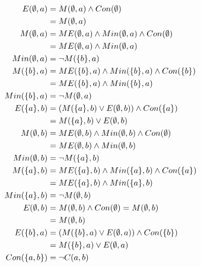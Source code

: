 \documentclass{article}
\begin{document}
\begin{example}
\begin{align*}
        E(\e, a)         & =  M(\e,a) \wedge Con(\e)                             \\
                         & = M(\e,a)                                             \\
        M(\e, a)         & =  ME(\e,a) \wedge Min(\e, a) \wedge Con(\e)          \\
                         & = ME(\e,a) \wedge Min(\e,a)                           \\
        Min(\e, a)       & = \neg M(\s{b},a)                                     \\
        M(\s{b}, a)      & =  ME(\s{b},a) \wedge Min(\s{b}, a) \wedge Con(\s{b}) \\
                         & =  ME(\s{b},a) \wedge Min(\s{b}, a)                   \\
        Min(\s{b}, a)    & = \neg M(\e, a)                                       \\
        E(\s{a}, b)      & = (M(\s{a},b) \vee E(\e,b))\wedge Con(\s{a})          \\
                         & = M(\s{a},b) \vee E(\e,b)                             \\
        M(\e, b)         & =  ME(\e,b) \wedge Min(\e, b) \wedge Con(\e)          \\
                         & =  ME(\e,b) \wedge Min(\e, b)                         \\
        Min(\e, b)       & = \neg M(\s{a},b)                                     \\
        M(\s{a}, b)      & =  ME(\s{a},b) \wedge Min(\s{a}, b) \wedge Con(\s{a}) \\
                         & =  ME(\s{a},b) \wedge Min(\s{a}, b)                   \\
        Min(\s{a}, b)    & = \neg M(\e, b)                                       \\
        E(\e, b)         & = M(\e,b) \wedge Con(\e) = M(\e,b)                    \\
                         & = M(\e,b)                                             \\
        E(\s{b}, a)      & = (M(\s{b},a) \vee E(\e,a))\wedge Con(\s{b})          \\
                         & = M(\s{b},a) \vee E(\e,a)                             \\
        Con(\s{a,b})     & = \neg C(a,b)                                         \\

\end{align*}
\end{example}
\end{document}
